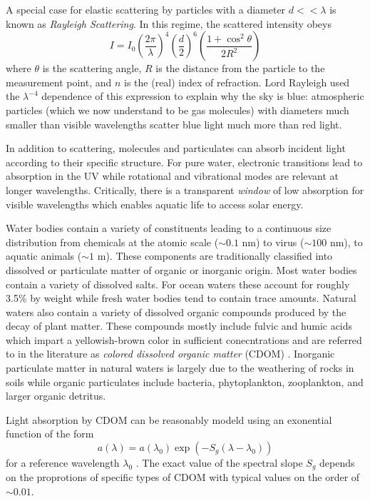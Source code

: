 A special case for elastic scattering by particles with a diameter $d <<
\lambda$ is known as \textit{Rayleigh Scattering}. In this regime, the scattered
intensity obeys
\begin{equation}
  I = I_0  \left( \frac{2\pi}{\lambda} \right)^4 \left( \frac{d}{2} \right)^6 \left( \frac{1 + \cos^2\theta}{2R^2} \right)
\end{equation}
where $\theta$ is the scattering angle, $R$ is the distance from the particle to
the measurement point, and $n$ is the (real) index of refraction. Lord Rayleigh
used the $\lambda^{-4}$ dependence of this expression to explain why the sky is
blue: atmospheric particles (which we now understand to be gas molecules) with
diameters much smaller than visible wavelengths scatter blue light
much more than red light.

In addition to scattering, molecules and particulates can absorb incident light
according to their specific structure. For pure water, electronic transitions
lead to absorption in the UV while rotational and vibrational modes are relevant
at longer wavelengths. Critically, there is a transparent \textit{window} of low
absorption for visible wavelengths which enables aquatic life to access solar
energy.

Water bodies contain a variety of constituents leading to a continuous size
distribution from chemicals at the atomic scale ($\sim$$0.1$ nm) to virus
($\sim$$100$ nm), to aquatic animals ($\sim$$1$ m). These components are traditionally
classified into dissolved or particulate matter of organic or inorganic origin.
Most water bodies contain a variety of dissolved salts. For ocean waters these
account for roughly 3.5\% by weight while fresh water bodies tend to contain
trace amounts. Natural waters also contain a variety of dissolved organic
compounds produced by the decay of plant matter. These compounds mostly include
fulvic and humic acids which impart a yellowish-brown color in sufficient
conecntrations and are referred to in the literature as \textit{colored
  dissolved organic matter} (CDOM) \cite{cdom-acids}. Inorganic particulate
matter in natural waters is largely due to the weathering of rocks in soils
while organic particulates include bacteria, phytoplankton, zooplankton, and
larger organic detritus.

Light absorption by CDOM can be reasonably modeld using an exonential function
of the form
\begin{equation}
  a(\lambda) = a(\lambda_0)\exp(-S_g(\lambda - \lambda_0))
\end{equation}
for a reference wavelength $\lambda_0$ \cite{aurin2018remote}. The exact
value of the spectral slope $S_g$ depends on the proprotions of specific types
of CDOM with typical values on the order of $\sim$$0.01$.

